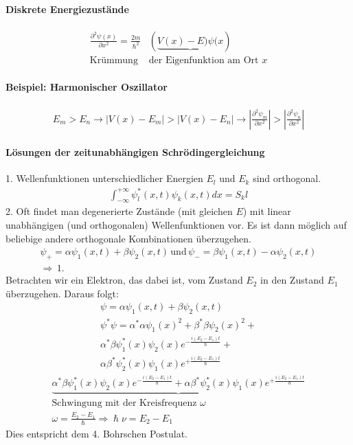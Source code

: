 \documentclass[10pt,a4paper]{article}
\begin{document}
\paragraph{Diskrete Energiezustände}
\begin{align}
\frac{\partial^2 \psi(x)}{\partial x^2} = \frac{2m}{\hslash^2}&(\underbrace{V(x) - E)\psi(x})\\
\text{Krümmung }&\text{der Eigenfunktion am Ort }x
\end{align}
\paragraph{Beispiel: Harmonischer Oszillator}
\begin{align}
E_m>E_n\rightarrow\left|V(x)-E_m\right|>\left|V(x)-E_n\right|\rightarrow \left|\frac{\partial^2\psi_m}{\partial x^2}\right|>\left|\frac{\partial^2\psi_n}{\partial x^2}\right|
\end{align}
\paragraph{Lösungen der zeitunabhängigen Schrödingergleichung}$\,$\\
1. Wellenfunktionen unterschiedlicher Energien $E_l$ und $E_k$ sind orthogonal.
\begin{align}
\int_{-\infty}^{+\infty} \psi^*_l(x,t) \psi_k(x,t)dx= S_kl
\end{align}
2. Oft findet man degenerierte Zustände (mit gleichen $E$) mit linear unabhängigen (und orthogonalen) Wellenfunktionen vor. Es ist dann möglich auf beliebige andere orthogonale Kombinationen überzugehen.
\begin{align}
\psi_+ = \alpha \psi_1(x,t) + \beta \psi_2(x,t)\, \text{und} \,\psi_- = \beta \psi_1(x,t) - \alpha \psi_2(x,t)\\
\Rightarrow\, 1.
\end{align}
Betrachten wir ein Elektron, das dabei ist, vom Zustand $E_2$ in den Zustand $E_1$ überzugehen. Daraus folgt:
\begin{align}
\psi = \alpha \psi_1(x,t) + \beta \psi_2(x,t) \\
\psi^*\psi = \alpha^*\alpha\psi_1(x)^2 + \beta^*\beta \psi_2(x)^2 +\\ \alpha^*\beta\psi_1^*(x)\psi_2(x)e^{-\frac{i(E_2-E_1)t}{\hslash}}+\\ \alpha\beta^*\psi_2^*(x)\psi_1(x)e^{+\frac{i(E_2-E_1)t}{\hslash}}
\end{align}
\begin{align}
\underbrace{\alpha^*\beta\psi_1^*(x)\psi_2(x)e^{-\frac{i(E_2-E_1)t}{\hslash}}+ \alpha\beta^*\psi_2^*(x)\psi_1(x)e^{+\frac{i(E_2-E_1)t}{\hslash}}}\\ \text{Schwingung mit der Kreisfrequenz }\omega\\
\omega = \frac{E_2-E_1}{\hslash} \Rightarrow \hslash\nu=E_2-E_1
\end{align}
Dies entspricht dem 4. Bohrschen Postulat.
\end{document}
